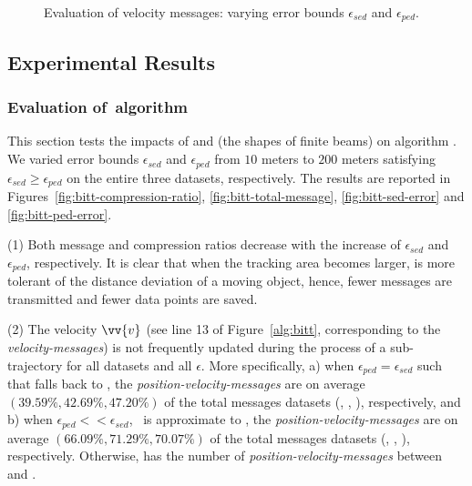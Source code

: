 {{\begin{figure}[tb!]
	\vspace{-2ex}
	\caption{\small Evaluation of velocity messages: varying error bounds $\epsilon_{sed}$ and $\epsilon_{ped}$.}
	\label{fig:speed-message}
	\vspace{-1ex}
\end{figure}
}%



\subsection{Experimental Results}

\subsubsection{Evaluation of~algorithm \bitt}
This section tests the impacts of \ped and \sed (\ie the shapes of finite beams) on algorithm \bitt. We varied error bounds $\epsilon_{sed}$ and $\epsilon_{ped}$ from $10$ meters to $200$ meters satisfying $\epsilon_{sed} \ge \epsilon_{ped}$ on the entire three datasets, respectively. The results are reported in Figures~\ref{fig:bitt-compression-ratio}, \ref{fig:bitt-total-message}, \ref{fig:bitt-sed-error} and \ref{fig:bitt-ped-error}.



\ni (1) Both message and compression ratios decrease with the increase of $\epsilon_{sed}$ and $\epsilon_{ped}$, respectively. It is clear that when the tracking area becomes larger, \bitt is more tolerant of the distance deviation of a moving object, hence, fewer messages are transmitted and fewer data points are saved.

\ni (2) The velocity  $\vv{v}$ (see line 13 of Figure~\ref{alg:bitt}, corresponding to the \emph{velocity-messages}) is not frequently updated during the process of a sub-trajectory for all datasets and all $\epsilon$. More specifically, 
a) when $\epsilon_{ped}=\epsilon_{sed}$ such that \bitt falls back to \citt, the \emph{position-velocity-messages} are on average $(39.59\%, 42.69\%, 47.20\%)$ of the total messages \wrt datasets (\mopsi, \sercar, \geolife), respectively, and 
b) when $\epsilon_{ped} << \epsilon_{sed}$, \ie~\bitt is approximate to \sitt, the \emph{position-velocity-messages} are on average $(66.09\%, 71.29\%, 70.07\%)$ of the total messages \wrt datasets (\mopsi, \sercar, \geolife), respectively. 
Otherwise, \bitt has the number of \emph{position-velocity-messages} between \citt and \sitt.

}
